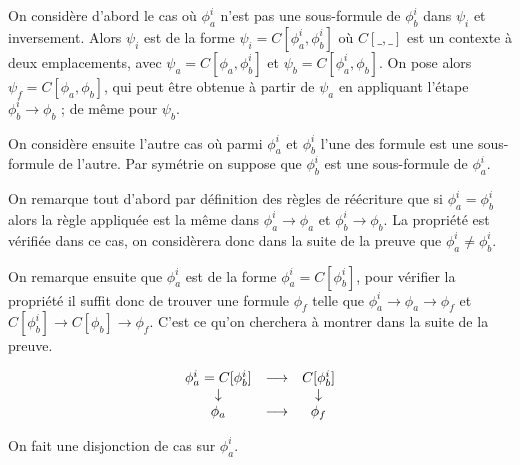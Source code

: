 \documentclass[12pt]{article}
\newcommand{\lra}{\ensuremath{\longrightarrow}}
\begin{document}
\smallskip
On considère d'abord le cas où \( \phi_a^i \) n'est pas une sous-formule de \( \phi_b^i \) dans  \(\psi_i\) et inversement.
Alors \( \psi_i\) est de la forme \(\psi_i = C[\phi_a^i, \phi_b^i]\) où \(C[\_,\_]\) est un contexte à deux emplacements, avec \(\psi_a = C[\phi_a, \phi_b^i]\) et \(\psi_b = C[\phi_a^i, \phi_b]\).
On pose alors \(\psi_f = C[\phi_a, \phi_b]\), qui peut être obtenue à partir de \(\psi_a\) en appliquant l'étape \(\phi_b^i \longrightarrow \phi_b \) ; de même pour \(\psi_b\).


\smallskip
On considère ensuite l'autre cas où parmi \(\phi_a^i\) et \(\phi_b^i\) l'une des formule est une sous-formule de l'autre.
Par symétrie on suppose que \(\phi_b^i\) est une sous-formule de \(\phi_a^i\).

On remarque tout d'abord par définition des règles de réécriture que si \(\phi_a^i = \phi_b^i\) alors la règle appliquée est la même dans \(\phi_a^i \lra \phi_a\) et \(\phi_b^i \lra \phi_b\).
La propriété est vérifiée dans ce cas, on considèrera donc dans la suite de la preuve que \(\phi_a^i \neq \phi_b^i\).

On remarque ensuite que \(\phi_a^i\) est de la forme \(\phi_a^i = C[\phi_b^i]\), pour vérifier la propriété il suffit donc de trouver une formule \(\phi_f\) telle que \(\phi_a^i \lra \phi_a \lra \phi_f\) et \(C[\phi_b^i] \lra C[\phi_b] \lra \phi_f\). C'est ce qu'on cherchera à montrer dans la suite de la preuve.

\[ \begin{array}{c c c}
     \phi_a^i = C[\phi_b^i] & \lra & C[\phi_b^i] \\
     \downarrow & & \downarrow \\
     \phi_a & \lra & \phi_f
   \end{array} \]

On fait une disjonction de cas sur \(\phi_a^i\).
\end{document}
